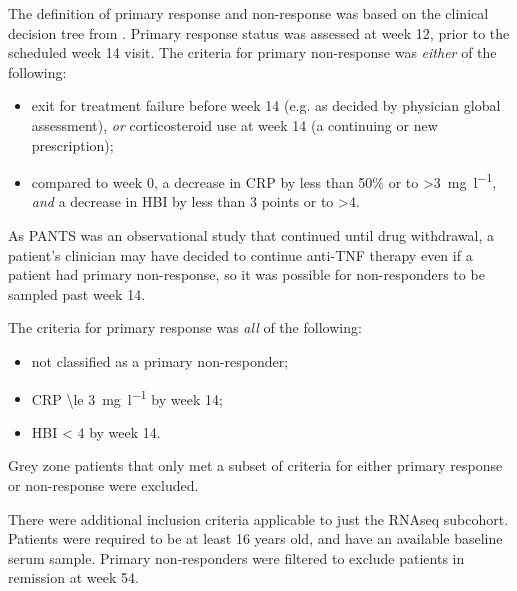 The definition of primary response and non-response was based on the clinical decision tree from \textcite{kennedy2019PredictorsAntiTNFTreatment}.
Primary response status was assessed at week 12, prior to the scheduled week 14 visit. 
The criteria for primary non-response was \emph{either} of the following: 
\begin{itemize}
    \item exit for treatment failure before week 14 (e.g. as decided by physician global assessment), \emph{or} corticosteroid use at week 14 (a continuing or new prescription);
    \item compared to week 0, a decrease in \gls{CRP} by less than 50\% or to >\SI{3}{\milli\gram\per\litre}, \emph{and} a decrease in \gls{HBI} by less than 3 points or to >4.
\end{itemize}
As \gls{PANTS} was an observational study that continued until drug withdrawal, a patient's clinician may have decided to continue anti-\gls{TNF} therapy even if a patient had primary non-response, so it was possible for non-responders to be sampled past week 14.

The criteria for primary response was \emph{all} of the following:
\begin{itemize}
    \item not classified as a primary non-responder;
    \item \gls{CRP} \SI{\le 3}{\milli\gram\per\litre} by week 14;
    \item \gls{HBI} < 4 by week 14.
\end{itemize}
Grey zone patients that only met a subset of criteria for either primary response or non-response were excluded.

%
There were additional inclusion criteria applicable to just the \gls{RNAseq} subcohort.
Patients were required to be at least 16 years old, and have an available baseline serum sample.
Primary non-responders were filtered to exclude patients in remission at week 54.

